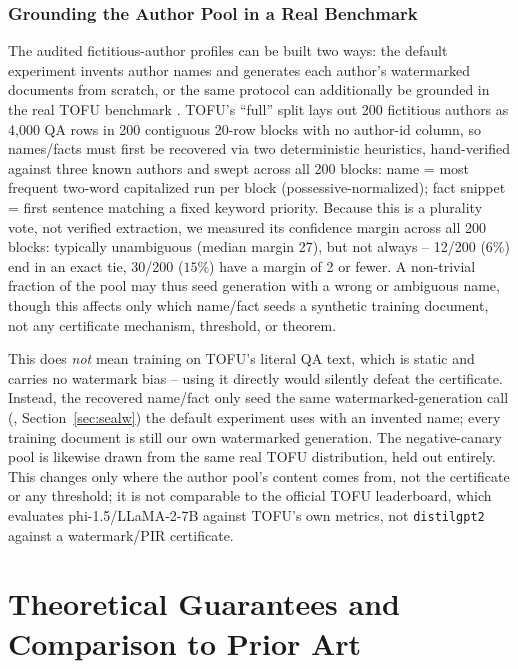 \documentclass[10pt,journal,compsoc]{IEEEtran}
\begin{document}
\subsubsection{Grounding the Author Pool in a Real Benchmark}
\label{sec:tofu-grounding}

The audited fictitious-author profiles can be built two ways: the default experiment invents author names and generates each author's watermarked documents from scratch, or the same protocol can additionally be grounded in the real TOFU benchmark \cite{maini2024tofu}. TOFU's ``full'' split lays out 200 fictitious authors as 4{,}000 QA rows in 200 contiguous 20-row blocks with no author-id column, so names/facts must first be recovered via two deterministic heuristics, hand-verified against three known authors and swept across all 200 blocks: name = most frequent two-word capitalized run per block (possessive-normalized); fact snippet = first sentence matching a fixed keyword priority. Because this is a plurality vote, not verified extraction, we measured its confidence margin across all 200 blocks: typically unambiguous (median margin 27), but not always -- 12/200 ($6\%$) end in an exact tie, 30/200 ($15\%$) have a margin of 2 or fewer. A non-trivial fraction of the pool may thus seed generation with a wrong or ambiguous name, though this affects only which name/fact seeds a synthetic training document, not any certificate mechanism, threshold, or theorem.

This does \emph{not} mean training on TOFU's literal QA text, which is static and carries no watermark bias -- using it directly would silently defeat the certificate. Instead, the recovered name/fact only seed the same watermarked-generation call (\cite{kirchenbauer2023watermark}, Section~\ref{sec:sealw}) the default experiment uses with an invented name; every training document is still our own watermarked generation. The negative-canary pool is likewise drawn from the same real TOFU distribution, held out entirely. This changes only where the author pool's content comes from, not the certificate or any threshold; it is not comparable to the official TOFU leaderboard, which evaluates phi-1.5/LLaMA-2-7B against TOFU's own metrics, not \texttt{distilgpt2} against a watermark/PIR certificate.

\section{Theoretical Guarantees and Comparison to Prior Art}
\label{sec:theory-and-comparison}
\end{document}
